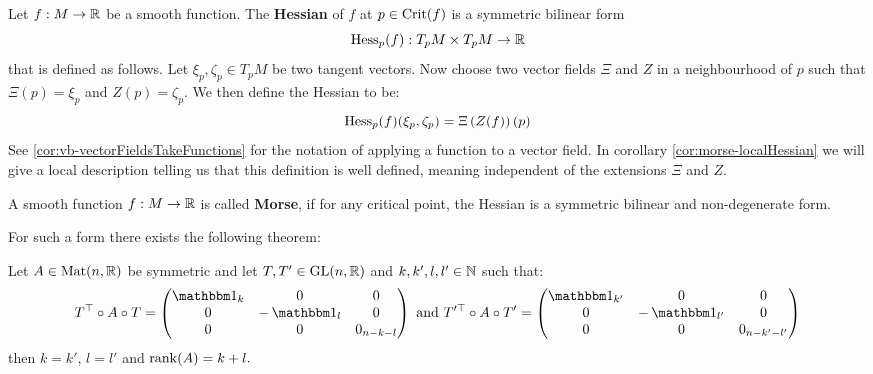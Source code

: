 \begin{definition}\label{def:morse-theHessian}
	Let $f:M\to \mathbb{R}$ be a smooth function. The \textbf{Hessian} of $f$ at $p\in \mathrm{Crit}(f)$ is a symmetric bilinear form
	\begin{equation*}
		\operatorname{\mathrm{Hess}}_p(f):T_pM\times T_pM \to \mathbb{R}
	\end{equation*}  that is defined as follows. Let $\xi_p, \zeta_p\in T_pM$ be two tangent vectors. Now choose two vector fields $\Xi$ and $Z$ in a neighbourhood of $p$ such that $\Xi(p)=\xi_p$ and $Z(p)=\zeta_p$. We then define the Hessian to be: 
	\begin{equation*}
		\operatorname{\mathrm{Hess}}_p(f)(\xi_p,\zeta_p)=\Xi \left(Z (f)\right)(p)
	\end{equation*} See \ref{cor:vb-vectorFieldsTakeFunctions} for the notation of applying a function to a vector field. In corollary \ref{cor:morse-localHessian} we will give a local description telling us that this definition is well defined, meaning independent of the extensions $\Xi$ and $Z$.  
\end{definition}
\begin{definition}
	A smooth function $f: M\to \mathbb{R}$ is called \textbf{Morse}, if for any critical point, the Hessian is a symmetric bilinear and non-degenerate form.
\end{definition}
 For such a form there exists the following theorem: 
 \begin{theorem}\label{thm:morse-sylvestersLawOfInertia}
 	Let $A\in \operatorname{\mathrm{Mat}}(n,\mathbb{R})$ be symmetric and let $T,T'\in \mathrm{GL}(n,\mathbb{R})$ and $k,k',l,l'\in \mathbb{N}$ such that:
 	\begin{align*}
 		T^\top \circ A\circ T=	\begin{pmatrix}
 			\Idm_k& 0 &0\\
 			0& -\Idm_l&0\\
 			0&0&0_{n-k-l}
 		\end{pmatrix}\text{ and } 
 		T'^\top \circ A \circ T'=
 		\begin{pmatrix}
 			\Idm_{k'}& 0 &0\\
 			0& -\Idm_{l'}&0\\
 			0&0&0_{n-k'-l'}
 		\end{pmatrix}
 	\end{align*}
 	then $k=k'$, $l=l'$ and $\operatorname{\mathrm{rank}}(A)=k+l.$
 \end{theorem}
 
